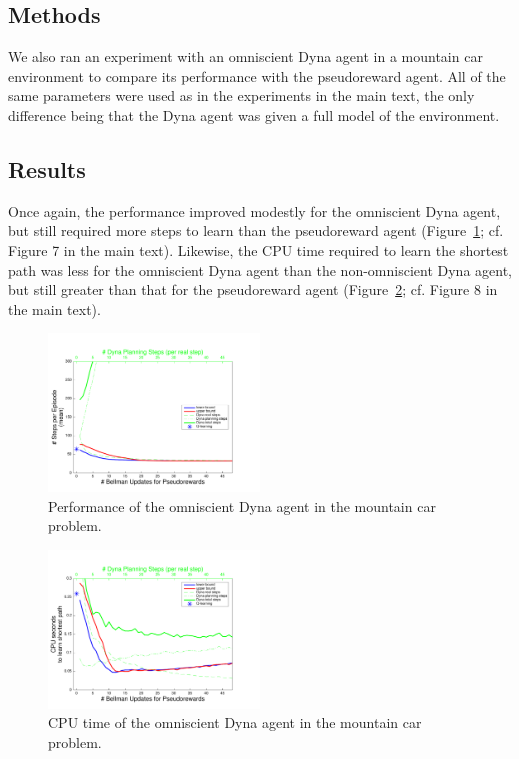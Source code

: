 \documentclass[letterpaper]{article}
\begin{document}
\subsection{Methods}

We also ran an experiment with an omniscient Dyna agent in a mountain car environment to compare its performance with the pseudoreward agent. All of the same parameters were used as in the experiments in the main text, the only difference being that the Dyna agent was given a full model of the environment.

\subsection{Results}

Once again, the performance improved modestly for the omniscient Dyna agent, but still required more steps to learn than the pseudoreward agent (Figure~\ref{fig:S2a}; cf. Figure 7 in the main text). Likewise, the CPU time required to learn the shortest path was less for the omniscient Dyna agent than the non-omniscient Dyna agent, but still greater than that for the pseudoreward agent (Figure~\ref{fig:S2b}; cf. Figure 8 in the main text).

\begin{figure}[ht]
\centering
\includegraphics[width=0.5\textwidth]{MC_learning_vs_PRiterations_omniscientDYNA_mean}
\caption{Performance of the omniscient Dyna agent in the mountain car problem.}
\label{fig:S2a}
\end{figure}

\begin{figure}[ht]
\centering
\includegraphics[width=0.5\textwidth]{MC_cpus_vs_PRiterations_omniscientDYNA_toGoal}
\caption{CPU time of the omniscient Dyna agent in the mountain car problem.}
\label{fig:S2b}
\end{figure}
\end{document}
